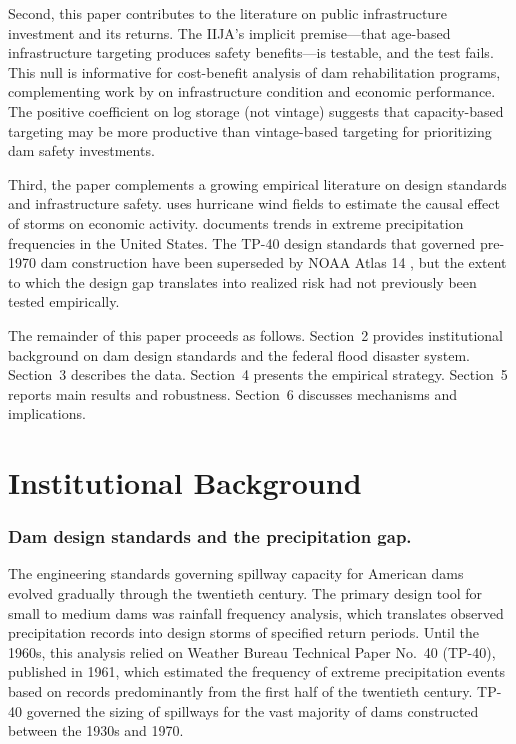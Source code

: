\documentclass[12pt]{article}
\begin{document}
Second, this paper contributes to the literature on public infrastructure investment and its returns. The IIJA's implicit premise---that age-based infrastructure targeting produces safety benefits---is testable, and the test fails. This null is informative for cost-benefit analysis of dam rehabilitation programs, complementing work by \citet{bridge2021} on infrastructure condition and economic performance. The positive coefficient on log storage (not vintage) suggests that capacity-based targeting may be more productive than vintage-based targeting for prioritizing dam safety investments.

Third, the paper complements a growing empirical literature on design standards and infrastructure safety. \citet{strobl2011} uses hurricane wind fields to estimate the causal effect of storms on economic activity. \citet{kunkel1999} documents trends in extreme precipitation frequencies in the United States. The TP-40 design standards that governed pre-1970 dam construction have been superseded by NOAA Atlas 14 \citep{noaaatlas2013}, but the extent to which the design gap translates into realized risk had not previously been tested empirically.

The remainder of this paper proceeds as follows. Section~2 provides institutional background on dam design standards and the federal flood disaster system. Section~3 describes the data. Section~4 presents the empirical strategy. Section~5 reports main results and robustness. Section~6 discusses mechanisms and implications.

\section{Institutional Background}

\subsubsection*{Dam design standards and the precipitation gap.}

The engineering standards governing spillway capacity for American dams evolved gradually through the twentieth century. The primary design tool for small to medium dams was rainfall frequency analysis, which translates observed precipitation records into design storms of specified return periods. Until the 1960s, this analysis relied on Weather Bureau Technical Paper No.~40 (TP-40), published in 1961, which estimated the frequency of extreme precipitation events based on records predominantly from the first half of the twentieth century. TP-40 governed the sizing of spillways for the vast majority of dams constructed between the 1930s and 1970.
\end{document}
